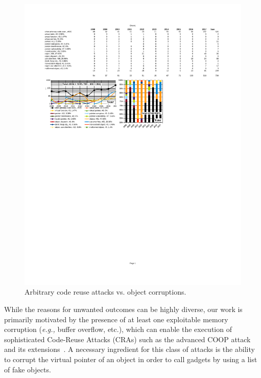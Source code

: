 \begin{figure}[t!]
\centering
\hspace{-.323cm}
  \includegraphics[scale=0.77]{figures/distri.pdf}
\caption{Arbitrary code reuse attacks vs. object corruptions.}
\label{ace:nvd:statistics}
\vspace{-.7cm}
\end{figure}

While the reasons for unwanted outcomes can be highly diverse, our work is primarily motivated by the presence of at least one exploitable
memory corruption (\textit{e.g.,} buffer overflow, etc.), which can enable the execution of sophisticated Code-Reuse Attacks (CRAs) such as the advanced COOP attack~\cite{schuster:coop} and its 
extensions~\cite{crane:readactor++, subversive-c:lettner, ctf:coop, loop:oriented}. A necessary ingredient for this class of attacks is the ability
to corrupt the virtual pointer of an object in order to call gadgets by using a list of fake objects.

